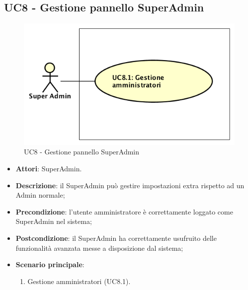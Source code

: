 \documentclass[../AnalisiDeiRequisiti_v4.0.0.tex]{subfiles}
\begin{document}
\subsection{UC8 - Gestione pannello SuperAdmin} 
\label{sssec:UC8} 
\begin{figure}[!h]
	\centering
	\includegraphics[width=\textwidth]{UseCases/UC8_GestionePannelloSuperadmin/UC8_GestionePannelloSuperadmin.png}
	\caption{UC8 - Gestione pannello SuperAdmin}
\end{figure}
\begin{itemize} 
\item \textbf{Attori}: SuperAdmin.
\item \textbf{Descrizione}: il SuperAdmin può gestire impostazioni extra rispetto ad un Admin normale;
\item \textbf{Precondizione}: l'utente amministratore è correttamente loggato come SuperAdmin nel sistema;
\item \textbf{Postcondizione}: il SuperAdmin ha correttamente usufruito delle funzionalità avanzata messe a disposizione dal sistema;
\item \textbf{Scenario principale}: \begin{enumerate}\item Gestione amministratori (UC8.1). 
 \end{enumerate}
\end{itemize} 
\newpage
\end{document}
